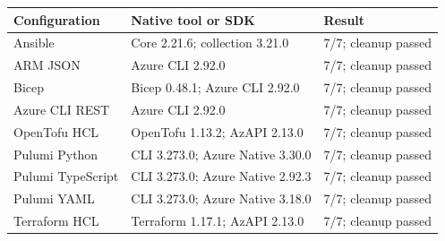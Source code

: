 \begin{tabular}{lll}\toprule
Configuration & Native tool or SDK & Result \\\midrule
Ansible & Core 2.21.6; collection 3.21.0 & 7/7; cleanup passed \\
ARM JSON & Azure CLI 2.92.0 & 7/7; cleanup passed \\
Bicep & Bicep 0.48.1; Azure CLI 2.92.0 & 7/7; cleanup passed \\
Azure CLI REST & Azure CLI 2.92.0 & 7/7; cleanup passed \\
OpenTofu HCL & OpenTofu 1.13.2; AzAPI 2.13.0 & 7/7; cleanup passed \\
Pulumi Python & CLI 3.273.0; Azure Native 3.30.0 & 7/7; cleanup passed \\
Pulumi TypeScript & CLI 3.273.0; Azure Native 2.92.3 & 7/7; cleanup passed \\
Pulumi YAML & CLI 3.273.0; Azure Native 3.18.0 & 7/7; cleanup passed \\
Terraform HCL & Terraform 1.17.1; AzAPI 2.13.0 & 7/7; cleanup passed \\
\bottomrule\end{tabular}
